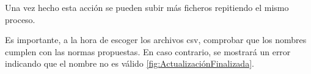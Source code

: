 
Una vez hecho esta acción se pueden subir más ficheros repitiendo el mismo proceso. 

Es importante, a la hora de escoger los archivos csv, comprobar que los nombres cumplen con las normas propuestas. En caso contrario, se mostrará un error indicando que el nombre no es válido \ref{fig:ActualizaciónFinalizada}. 


